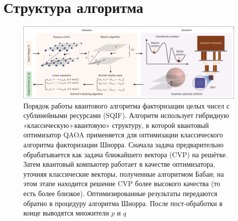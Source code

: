 
\section{Структура алгоритма}

\begin{figure}
    \centering
    \includegraphics[scale=0.4]{inc/fig_01.png}
    \caption{
        Порядок работы квантового алгоритма факторизации целых чисел с
        сублинейными ресурсами (SQIF). Алгоритм использует гибридную
        «классическую+квантовую» структуру, в которой квантовый оптимизатор
        QAOA применяется для оптимизации классического алгоритма факторизации
        Шнорра. Сначала задача предварительно обрабатывается как задача
        ближайшего вектора (CVP) на решётке. Затем квантовый компьютер
        работает в качестве оптимизатора, уточняя классические векторы,
        полученные алгоритмом Бабаи; на этом этапе находится решение CVP
        более высокого качества (то есть более близкое). Оптимизированные
        результаты передаются обратно в процедуру алгоритма Шнорра. После
        пост‑обработки в конце выводятся множители $p$ и $q$
    }
    \label{fig:fig01}
\end{figure}

